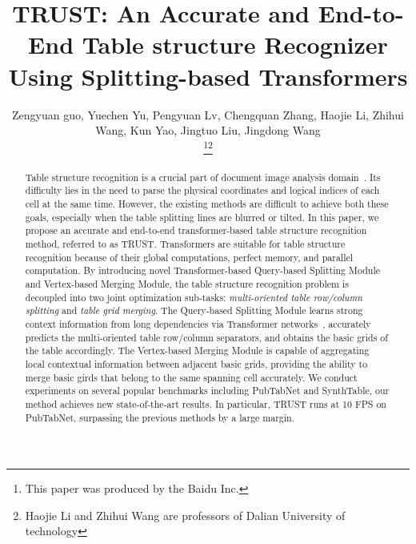 \documentclass[lettersize,journal]{IEEEtran}
\begin{document}
\title{TRUST: An Accurate and End-to-End Table structure Recognizer Using Splitting-based Transformers}

\author{Zengyuan guo, Yuechen Yu, Pengyuan Lv, Chengquan Zhang, Haojie Li, Zhihui Wang, Kun Yao, Jingtuo Liu, Jingdong Wang

\thanks{This paper was produced by the Baidu Inc.}\thanks{Haojie Li and Zhihui Wang are professors of Dalian University of technology}}





\maketitle

\begin{abstract}
Table structure recognition is a crucial part of document image analysis domain~\cite{hashmi2021current}. Its difficulty lies in the need to parse the physical coordinates and logical indices of each cell at the same time. However, the existing methods are difficult to achieve both these goals, especially when the table splitting lines are blurred or tilted. In this paper, we propose an accurate and end-to-end transformer-based table structure recognition method, referred to as TRUST. Transformers are suitable for table structure recognition because of their global computations, perfect memory, and parallel computation. By introducing novel Transformer-based Query-based Splitting Module and Vertex-based Merging Module, the table structure recognition problem is decoupled into two joint optimization sub-tasks: \emph{multi-oriented table row/column splitting} and \emph{table grid merging}. The Query-based Splitting Module learns strong context information from long dependencies via Transformer networks~\cite{vaswani2017attention}, accurately predicts the multi-oriented table row/column separators, and obtains the basic grids of the table accordingly. The Vertex-based Merging Module is capable of aggregating local contextual information between adjacent basic grids, providing the ability to merge basic girds that belong to the same spanning cell accurately. We conduct experiments on several popular benchmarks including PubTabNet\cite{zhong2020image} and SynthTable\cite{qasim2019rethinking}, our method achieves new state-of-the-art results. In particular, TRUST runs at 10 FPS on PubTabNet, surpassing the previous methods by a large margin.
\end{abstract}
\end{document}
